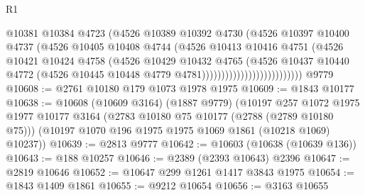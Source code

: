 \begin{lexlean}{R1}
\begin{coremodule}
                                        @10381
                                        @10384
                                        @4723
                                        (@4526
                                          @10389
                                          @10392
                                          @4730
                                          (@4526
                                            @10397
                                            @10400
                                            @4737
                                            (@4526
                                              @10405
                                              @10408
                                              @4744
                                              (@4526
                                                @10413
                                                @10416
                                                @4751
                                                (@4526
                                                  @10421
                                                  @10424
                                                  @4758
                                                  (@4526
                                                    @10429
                                                    @10432
                                                    @4765
                                                    (@4526
                                                      @10437
                                                      @10440
                                                      @4772
                                                      (@4526
                                                        @10445
                                                        @10448
                                                        @4779
                                                        @4781))))))))))))))))))))))))))
    @9779
@10608 := @2761 @10180 @179 @1073 @1978 @1975
@10609 := @1843 @10177
@10638 := @10608
    (@10609 @3164)
    (@1887 @9779)
    (@10197
      @257
      @1072
      @1975
      @1977
      @10177
      @3164
      (@2783 @10180 @75 @10177 (@2788 (@2789 @10180 @75)))
      (@10197 @1070 @196 @1975 @1975 @1069 @1861 (@10218 @1069) @10237))
@10639 := @2813 @9777
@10642 := @10603 (@10638 (@10639 @136))
@10643 := @188 @10257
@10646 := @2389 (@2393 @10643) @2396
@10647 := @2819 @10646
@10652 := @10647 @299 @1261 @1417 @3843 @1975
@10654 := @1843 @1409 @1861
@10655 := @9212 @10654
@10656 := @3163 @10655

\end{coremodule}
\end{lexlean}
